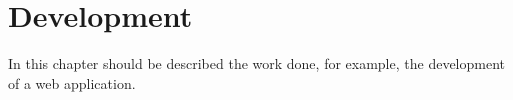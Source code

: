 \chapter{Development}\label{development}

In this chapter should be described the work done, for example, the development of a web application.